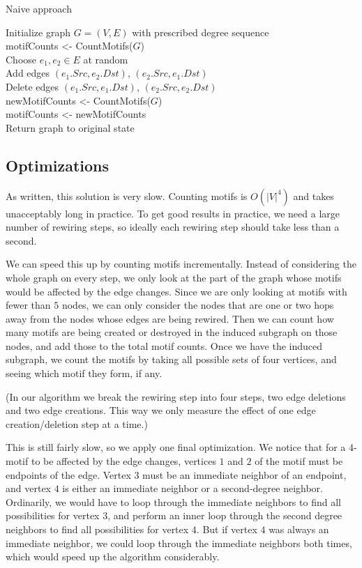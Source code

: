 \begin{algorithm}[t]
\caption{Naive approach}
\label{algorithm:naive}
\begin{algorithmic}
Initialize graph $G = (V, E)$ with prescribed degree sequence\\
motifCounts <- CountMotifs($G$)\\
 {
	Choose $e_1, e_2 \in E$ at random\\
	Add edges $(e_1.Src, e_2.Dst)$, $(e_2.Src, e_1.Dst)$\\
	Delete edges $(e_1.Src, e_1.Dst)$, $(e_2.Src, e_2.Dst)$\\
	newMotifCounts <- CountMotifs($G$)\\
	 {
		motifCounts <- newMotifCounts\\
	} {
		Return graph to original state\\
	}
}

\end{algorithmic}
\end{algorithm}

\subsection{Optimizations}
As written, this solution is very slow.  Counting motifs is $O(|V|^4)$ and takes unacceptably long in practice.  To get good results in practice, we need a large number of rewiring steps, so ideally each rewiring step should take less than a second.

We can speed this up by counting motifs incrementally.  Instead of considering the whole graph on every step, we only look at the part of the graph whose motifs would be affected by the edge changes.  Since we are only looking at motifs with fewer than $5$ nodes, we can only consider the nodes that are one or two hops away from the nodes whose edges are being rewired.  Then we can count how many motifs are being created or destroyed in the induced subgraph on those nodes, and add those to the total motif counts.  Once we have the induced subgraph, we count the motifs by taking all possible sets of four vertices, and seeing which motif they form, if any.

(In our algorithm we break the rewiring step into four steps, two edge deletions and two edge creations.  This way we only measure the effect of one edge creation/deletion step at a time.)

This is still fairly slow, so we apply one final optimization.  We notice that for a 4-motif to be affected by the edge changes, vertices $1$ and $2$ of the motif must be endpoints of the edge.  Vertex $3$ must be an immediate neighbor of an endpoint, and vertex $4$ is either an immediate neighbor or a second-degree neighbor.  Ordinarily, we would have to loop through the immediate neighbors to find all possibilities for vertex $3$, and perform an inner loop through the second degree neighbors to find all possibilities for vertex $4$.  But if vertex $4$ was always an immediate neighbor, we could loop through the immediate neighbors both times, which would speed up the algorithm considerably.

